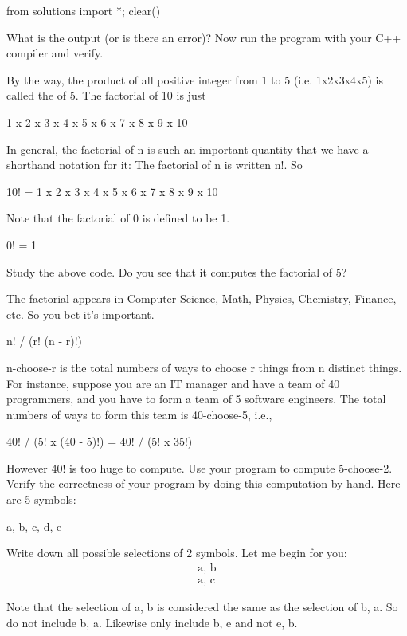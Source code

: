 \begin{python0}
from solutions import *; clear()
\end{python0}


What is the output (or is there an error)? Now run the program with your
C++ compiler and verify.

By the way, the product of all positive integer from 1 to 5 (i.e.
1x2x3x4x5) is called the  of 5. The factorial of 10 is
just
\begin{center}
1 x 2 x 3 x 4 x 5 x 6 x 7 x 8 x 9 x 10
\end{center}
In general, the factorial of n is such an important quantity that we
have a shorthand notation for it: The factorial of n is written n!. So
\begin{center}
10! = 1 x 2 x 3 x 4 x 5 x 6 x 7 x 8 x 9 x 10
\end{center}
Note that the factorial of 0 is defined to be 1.
\begin{center}
0! = 1
\end{center}
Study the above code. Do you see that it computes the factorial of 5?

The factorial appears in Computer Science, Math, Physics, Chemistry,
Finance, etc. So you bet it's important.





\begin{center}
n! / (r! (n - r)!)
\end{center}
n-choose-r is the total numbers of ways to choose r things from n
distinct things. For instance, suppose you are an IT manager and have a
team of 40 programmers, and you have to form a team of 5 software
engineers. The total numbers of ways to form this team is 40-choose-5,
i.e.,
\begin{center}
40! / (5! x (40 - 5)!) = 40! / (5! x 35!)
\end{center}
However 40! is too huge to compute. Use your program to compute
5-choose-2. Verify the correctness of your program by doing this
computation by hand. Here are 5 symbols:

\begin{center}
a, b, c, d, e
\end{center}
Write down all possible selections of 2 symbols. Let me begin for you:
\begin{align*}
\text{a, b}\\
\text{a, c}
\end{align*}

Note that the selection of a, b is considered the same as the selection of b, a. So do not include b, a. Likewise only include b, e and not e, b.

